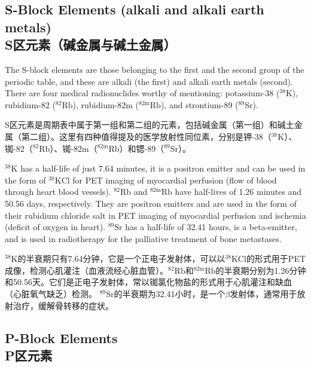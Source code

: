 \documentclass[dvipsnames, svgnames,a4paper,11pt]{article}
\begin{document}
\subsection{S-Block Elements (alkali and alkali earth metals) \\S区元素（碱金属与碱土金属）}  

The S-block elements are those belonging to the first and the second group of the periodic table, and these are alkali (the first) and alkali earth metals (second). There are four medical radionuclides worthy of mentioning: potassium-38 (\(\mathrm{^{38}K}\)), rubidium-82 (\(\mathrm{^{82}Rb}\)), rubidium-82m (\(\mathrm{^{82m}Rb}\)), and strontium-89 (\(\mathrm{^{89}Sr}\)).

S区元素是周期表中属于第一组和第二组的元素，包括碱金属（第一组）和碱土金属（第二组）。这里有四种值得提及的医学放射性同位素，分别是钾-38（\(\mathrm{^{38}K}\)）、铷-82（\(\mathrm{^{82}Rb}\)）、铷-82m（\(\mathrm{^{82m}Rb}\)）和锶-89（\(\mathrm{^{89}Sr}\)）。

\(\mathrm{^{38}K}\) has a half-life of just 7.64 minutes, it is a positron emitter and can be used in the form of \(\mathrm{^{38}KCl}\) for PET imaging of myocardial perfusion (flow of blood through heart blood vessels). \(\mathrm{^{82}Rb}\) and \(\mathrm{^{82m}Rb}\) have half-lives of 1.26 minutes and 50.56 days, respectively. They are positron emitters and are used in the form of their rubidium chloride salt in PET imaging of myocardial perfusion and ischemia (deficit of oxygen in heart). \(\mathrm{^{89}Sr}\) has a half-life of 32.41 hours, is a beta-emitter, and is used in radiotherapy for the palliative treatment of bone metastases.

\(\mathrm{^{38}K}\)的半衰期只有7.64分钟，它是一个正电子发射体，可以以\(\mathrm{^{38}KCl}\)的形式用于PET成像，检测心肌灌注（血液流经心脏血管）。\(\mathrm{^{82}Rb}\)和\(\mathrm{^{82m}Rb}\)的半衰期分别为1.26分钟和50.56天。它们是正电子发射体，常以铷氯化物盐的形式用于心肌灌注和缺血（心脏氧气缺乏）检测。 \(\mathrm{^{89}Sr}\)的半衰期为32.41小时，是一个$\beta$发射体，通常用于放射治疗，缓解骨转移的症状。

\subsection{P-Block Elements \\P区元素}
\end{document}
